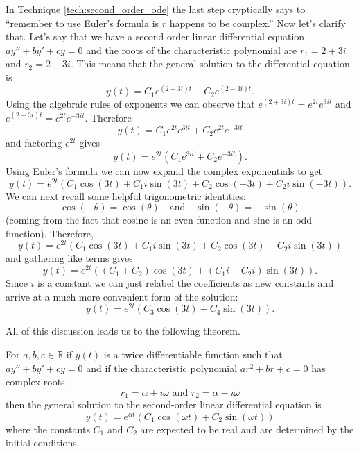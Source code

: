 In Technique \ref{tech:second_order_ode} the last step cryptically says to ``remember to
use Euler's formula is $r$ happens to be complex.''  Now let's clarify that.  Let's say
that we have a second order linear differential equation $ay'' + by' + cy = 0$ and the
roots of the characteristic polynomial are $r_1 = 2+3i$ and $r_2 = 2-3i$.  This means that
the general solution to the differential equation is 
\[ y(t) = C_1 e^{(2+3i)t} + C_2 e^{(2-3i)t}. \]
Using the algebraic rules of exponents we can observe that $e^{(2+3i)t} = e^{2t} e^{3it}$
and $e^{(2-3i)t} = e^{2t} e^{-3it}$.  Therefore
\[ y(t) =  C_1 e^{2t} e^{3it} + C_2 e^{2t} e^{-3it} \]
and factoring $e^{2t}$ gives
\[ y(t) = e^{2t} \left( C_1 e^{3it} + C_2 e^{-3it} \right). \]
Using Euler's formula we can now expand the complex exponentials to get
\[ y(t) = e^{2t} \left( C_1 \cos(3t) + C_1 i \sin(3t) + C_2 \cos(-3t) + C_2 i \sin(-3t)
    \right). \]
We can next recall some helpful trigonometric identities:
\[ \cos(-\theta) = \cos(\theta) \quad \text{and} \quad \sin(-\theta) = -\sin(\theta) \]
(coming from the fact that cosine is an even function and sine is an odd function).
Therefore,
\[ y(t) = e^{2t} \left( C_1 \cos(3t) + C_1 i \sin(3t) + C_2 \cos(3t) - C_2 i \sin(3t)
    \right) \]
and gathering like terms gives
\[ y(t) = e^{2t} \left( (C_1 + C_2)\cos(3t) + (C_1i - C_2i) \sin(3t) \right). \]
Since $i$ is a constant we can just relabel the coefficients as new constants and arrive
at a much more convenient form of the solution:
\[ y(t) = e^{2t} \left( C_3 \cos(3t) + C_4 \sin(3t) \right). \]

All of this discussion leads us to the following theorem.
\begin{thm}
    For $a,b,c\in \mathbb{R}$ if $y(t)$ is a twice differentiable function such that $ay'' + by' + cy = 0$ and
    if the characteristic polynomial $ar^2 + br + c = 0$ has complex roots 
    \[ r_1 = \alpha + i \omega \text{ and } r_2 = \alpha - i \omega\]
    then the general solution to the second-order linear differential equation is
    \[ y(t) = e^{\alpha t} \left( C_1 \cos(\omega t) + C_2 \sin(\omega t) \right) \]
    where the constants $C_1$ and $C_2$ are expected to be real and are determined by the
    initial conditions.
\end{thm}

